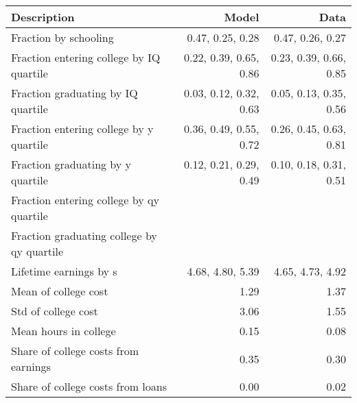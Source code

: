 \begin{tabular}{lrr}
\hline
Description & Model  & Data  \\
\hline
Fraction by schooling & 0.47, 0.25, 0.28  & 0.47, 0.26, 0.27  \\
Fraction entering college by IQ quartile & 0.22, 0.39, 0.65, 0.86  & 0.23, 0.39, 0.66, 0.85  \\
Fraction graduating by IQ quartile & 0.03, 0.12, 0.32, 0.63  & 0.05, 0.13, 0.35, 0.56  \\
Fraction entering college by y quartile & 0.36, 0.49, 0.55, 0.72  & 0.26, 0.45, 0.63, 0.81  \\
Fraction graduating by y quartile & 0.12, 0.21, 0.29, 0.49  & 0.10, 0.18, 0.31, 0.51  \\
Fraction entering college by qy quartile &   &   \\
Fraction graduating college by qy quartile &   &   \\
Lifetime earnings by s & 4.68, 4.80, 5.39  & 4.65, 4.73, 4.92  \\
Mean of college cost & 1.29  & 1.37  \\
Std of college cost & 3.06  & 1.55  \\
Mean hours in college & 0.15  & 0.08  \\
Share of college costs from earnings & 0.35  & 0.30  \\
Share of college costs from loans & 0.00  & 0.02  \\
\hline
\end{tabular}%
